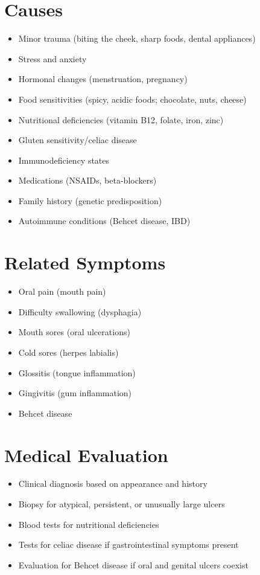 \section*{Causes}
\begin{itemize}
\item Minor trauma (biting the cheek, sharp foods, dental appliances)
\item Stress and anxiety
\item Hormonal changes (menstruation, pregnancy)
\item Food sensitivities (spicy, acidic foods; chocolate, nuts, cheese)
\item Nutritional deficiencies (vitamin B12, folate, iron, zinc)
\item Gluten sensitivity/celiac disease
\item Immunodeficiency states
\item Medications (NSAIDs, beta-blockers)
\item Family history (genetic predisposition)
\item Autoimmune conditions (Behcet disease, IBD)
\end{itemize}

\section*{Related Symptoms}
\begin{itemize}
\item Oral pain (mouth pain)
\item Difficulty swallowing (dysphagia)
\item Mouth sores (oral ulcerations)
\item Cold sores (herpes labialis)
\item Glossitis (tongue inflammation)
\item Gingivitis (gum inflammation)
\item Behcet disease
\end{itemize}

\section*{Medical Evaluation}
\begin{itemize}
\item Clinical diagnosis based on appearance and history
\item Biopsy for atypical, persistent, or unusually large ulcers
\item Blood tests for nutritional deficiencies
\item Tests for celiac disease if gastrointestinal symptoms present
\item Evaluation for Behcet disease if oral and genital ulcers coexist
\end{itemize}

